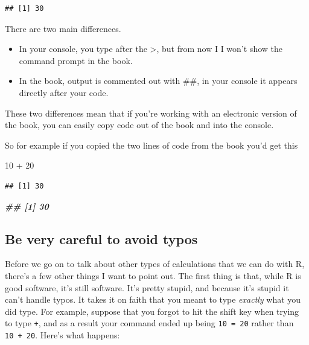\documentclass[
]{book}
\newenvironment{Shaded}{\begin{snugshade}}{\end{snugshade}}
\newcommand{\DecValTok}[1]{\textcolor[rgb]{0.00,0.00,0.81}{#1}}
\newcommand{\DocumentationTok}[1]{\textcolor[rgb]{0.56,0.35,0.01}{\textbf{\textit{#1}}}}
\newcommand{\SpecialCharTok}[1]{\textcolor[rgb]{0.00,0.00,0.00}{#1}}
\providecommand{\tightlist}{%
  \setlength{\itemsep}{0pt}\setlength{\parskip}{0pt}}
\begin{document}
\begin{verbatim}
## [1] 30
\end{verbatim}

There are two main differences.

\begin{itemize}
\tightlist
\item
  In your console, you type after the \textgreater, but from now I I won't show the command prompt in the book.\\
\item
  In the book, output is commented out with \#\#, in your console it appears directly after your code.
\end{itemize}

These two differences mean that if you're working with an electronic version of the book, you can easily copy code out of the book and into the console.

So for example if you copied the two lines of code from the book you'd get this

\begin{Shaded}
\begin{Highlighting}[]
\DecValTok{10} \SpecialCharTok{+} \DecValTok{20}
\end{Highlighting}
\end{Shaded}

\begin{verbatim}
## [1] 30
\end{verbatim}

\begin{Shaded}
\begin{Highlighting}[]
\DocumentationTok{\#\# [1] 30}
\end{Highlighting}
\end{Shaded}

\hypertarget{be-very-careful-to-avoid-typos}{%
\subsection{Be very careful to avoid typos}\label{be-very-careful-to-avoid-typos}}

Before we go on to talk about other types of calculations that we can do with R, there's a few other things I want to point out. The first thing is that, while R is good software, it's still software. It's pretty stupid, and because it's stupid it can't handle typos. It takes it on faith that you meant to type \emph{exactly} what you did type. For example, suppose that you forgot to hit the shift key when trying to type \texttt{+}, and as a result your command ended up being \texttt{10\ =\ 20} rather than \texttt{10\ +\ 20}. Here's what happens:
\end{document}
